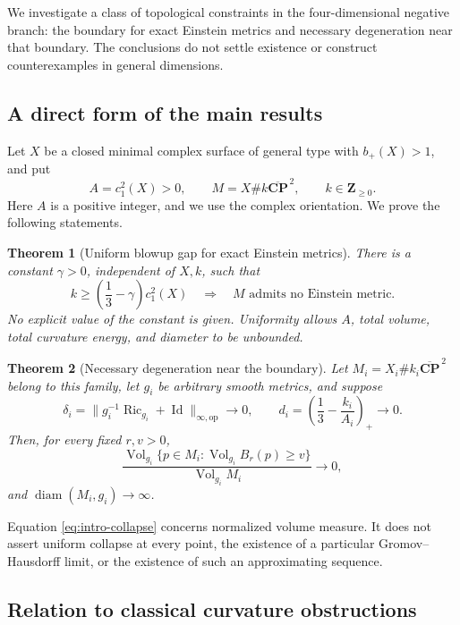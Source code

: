 \documentclass[a4paper,11pt]{article}
\theoremstyle{paper}
\newtheorem{theorem}{Theorem}[section]
\DeclareMathOperator{\Ric}{Ric}
\DeclareMathOperator{\Vol}{Vol}
\DeclareMathOperator{\diam}{diam}
\DeclareMathOperator{\Id}{Id}
\newcommand{\op}{\mathrm{op}}
\numberwithin{equation}{section}
\begin{document}
We investigate a class of topological constraints in the four-dimensional negative branch: the boundary for exact Einstein metrics and necessary degeneration near that boundary. The conclusions do not settle existence or construct counterexamples in general dimensions.

\subsection{A direct form of the main results}

Let $X$ be a closed minimal complex surface of general type with $b_+(X)>1$, and put
\[
A=c_1^2(X)>0,\qquad M=X\#k\overline{\mathbf{CP}}^{\,2},\qquad k\in\mathbf Z_{\ge0}.
\]
Here $A$ is a positive integer, and we use the complex orientation. We prove the following statements.

\begin{theorem}[Uniform blowup gap for exact Einstein metrics]\label{thm:intro-exact}
There is a constant $\gamma>0$, independent of $X,k$, such that
\[
k\ge\left(\frac13-\gamma\right)c_1^2(X)
\quad\Longrightarrow\quad
M\text{ admits no Einstein metric}.
\]
No explicit value of the constant is given. Uniformity allows $A$, total volume, total curvature energy, and diameter to be unbounded.
\end{theorem}

\begin{theorem}[Necessary degeneration near the boundary]\label{thm:intro-collapse}
Let $M_i=X_i\#k_i\overline{\mathbf{CP}}^{\,2}$ belong to this family, let $g_i$ be arbitrary smooth metrics, and suppose
\[
\delta_i=\|g_i^{-1}\Ric_{g_i}+\Id\|_{\infty,\op}\longrightarrow0,
\qquad d_i=\left(\frac13-\frac{k_i}{A_i}\right)_+\longrightarrow0.
\]
Then, for every fixed $r,v>0$,
\begin{equation}\label{eq:intro-collapse}
\frac{\Vol_{g_i}\{p\in M_i:\Vol_{g_i}B_r(p)\ge v\}}
{\Vol_{g_i}M_i}\longrightarrow0,
\end{equation}
and $\diam(M_i,g_i)\to\infty$.
\end{theorem}

Equation \eqref{eq:intro-collapse} concerns normalized volume measure. It does not assert uniform collapse at every point, the existence of a particular Gromov--Hausdorff limit, or the existence of such an approximating sequence.

\subsection{Relation to classical curvature obstructions}
\end{document}
